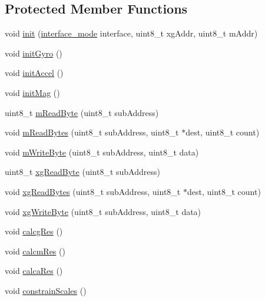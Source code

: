 \subsection*{Protected Member Functions}
\begin{DoxyCompactItemize}
\item 
void \hyperlink{class_l_s_m9_d_s1_aa4f74e09e93c0133dc30545d4492849e}{init} (\hyperlink{_l_s_m9_d_s1___types_8h_abd62c19dfd2401eba73af16c64296adf}{interface\+\_\+mode} interface, uint8\+\_\+t xg\+Addr, uint8\+\_\+t m\+Addr)
\item 
void \hyperlink{class_l_s_m9_d_s1_a66a7b02acb28964ffc9362f25988e270}{init\+Gyro} ()
\item 
void \hyperlink{class_l_s_m9_d_s1_a143ff5abf4f7ba8e1c42325859106f84}{init\+Accel} ()
\item 
void \hyperlink{class_l_s_m9_d_s1_a492aa6edcf891f273d932636e3cc470d}{init\+Mag} ()
\item 
uint8\+\_\+t \hyperlink{class_l_s_m9_d_s1_ae4e470321567e4f93fc09f4cc6cd9efa}{m\+Read\+Byte} (uint8\+\_\+t sub\+Address)
\item 
void \hyperlink{class_l_s_m9_d_s1_acfdf9862cad1e66c9fb61a17bfbe7477}{m\+Read\+Bytes} (uint8\+\_\+t sub\+Address, uint8\+\_\+t $\ast$dest, uint8\+\_\+t count)
\item 
void \hyperlink{class_l_s_m9_d_s1_afc171c924102c97fa1d88fa7f48bd167}{m\+Write\+Byte} (uint8\+\_\+t sub\+Address, uint8\+\_\+t data)
\item 
uint8\+\_\+t \hyperlink{class_l_s_m9_d_s1_af7f9789df6f0178764c815a3380c202a}{xg\+Read\+Byte} (uint8\+\_\+t sub\+Address)
\item 
void \hyperlink{class_l_s_m9_d_s1_ae0a9cbfd74b1f4676f091c2d8e491d77}{xg\+Read\+Bytes} (uint8\+\_\+t sub\+Address, uint8\+\_\+t $\ast$dest, uint8\+\_\+t count)
\item 
void \hyperlink{class_l_s_m9_d_s1_a263eed4b52ad087a1195755c6ba49e62}{xg\+Write\+Byte} (uint8\+\_\+t sub\+Address, uint8\+\_\+t data)
\item 
void \hyperlink{class_l_s_m9_d_s1_a303e0dd33e000579dc3917aecedb6e63}{calcg\+Res} ()
\item 
void \hyperlink{class_l_s_m9_d_s1_a830dfc95c7e2d8524720d78357b053cb}{calcm\+Res} ()
\item 
void \hyperlink{class_l_s_m9_d_s1_a31597c9ae6c5a7de64a50cbbbcd24297}{calca\+Res} ()
\item 
void \hyperlink{class_l_s_m9_d_s1_a5aadcd09cf9157de817c359e49304ca7}{constrain\+Scales} ()
\item 

\end{DoxyCompactItemize}
